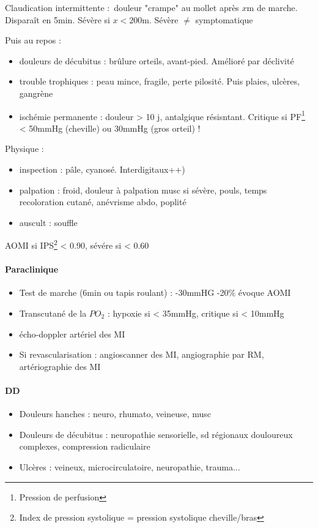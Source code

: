 \documentclass{article}
\begin{document}
Claudication intermittente : douleur "crampe" au mollet après $x$m de marche.
Disparaît en 5min. Sévère si $x < 200$m. \danger{} Sévère $\neq$ symptomatique

Puis au repos : 
\begin{itemize}
  \item douleurs de décubitus : brûlure orteils, avant-pied. Amélioré par
    déclivité
  \item trouble trophiques : peau mince, fragile, perte pilosité. Puis plaies,
    ulcères, gangrène
  \item ischémie permanente : douleur > 10 j, antalgique résisntant. Critique si
    PF\footnote{Pression de perfusion} < 50mmHg (cheville) ou 30mmHg (gros
    orteil) !
\end{itemize}
Physique : 
\begin{itemize}
  \item inspection : pâle, cyanosé. Interdigitaux++)
  \item palpation : froid, douleur à palpation musc si sévère, pouls, temps recoloration cutané, anévrisme
abdo, poplité
  \item auscult : souffle
\end{itemize}
AOMI si IPS\footnote{Index de pression systolique = pression systolique
cheville/bras} < 0.90, sévére si < 0.60

\paragraph{Paraclinique}
\begin{itemize}
  \item Test de marche (6min ou tapis roulant) : -30mmHG \lor{} -20\% évoque AOMI
  \item Transcutané de la $PO_2$ : hypoxie si < 35mmHg, critique si < 10mmHg
  \item écho-doppler artériel des MI
  \item Si revascularisation : angioscanner des MI, angiographie par RM,
    artériographie des MI
\end{itemize}

\paragraph{DD} 
\begin{itemize}
  \item Douleurs hanches : neuro, rhumato, veineuse, musc
  \item Douleurs de décubitus : neuropathie sensorielle, sd régionaux douloureux
    complexes, compression radiculaire
  \item Ulcères : veineux, microcirculatoire, neuropathie, trauma...
\end{itemize}
\end{document}
